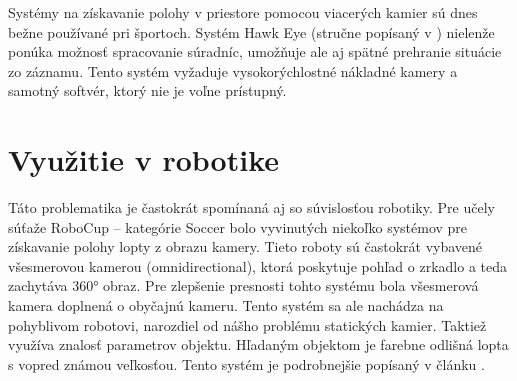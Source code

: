 Systémy na získavanie polohy v priestore pomocou viacerých kamier sú dnes bežne
používané pri športoch. Systém Hawk Eye (stručne popísaný v
\citet*{owens2003hawk}) nielenže ponúka možnosť spracovanie súradníc, umožňuje
ale aj spätné prehranie situácie zo záznamu. Tento systém vyžaduje
vysokorýchlostné nákladné kamery a samotný softvér, ktorý nie je voľne
prístupný.

\section{Využitie v robotike}

Táto problematika je častokrát spomínaná aj so súvislosťou robotiky. Pre učely
súťaže RoboCup -- kategórie Soccer bolo vyvinutých niekoľko systémov pre
získavanie polohy lopty z obrazu kamery. Tieto roboty sú častokrát vybavené
všesmerovou kamerou (omnidirectional), ktorá poskytuje pohľad o zrkadlo a teda
zachytáva 360° obraz. Pre zlepšenie presnosti tohto systému bola všesmerová
kamera doplnená o obyčajnú kameru. Tento systém sa ale nachádza na pohyblivom
robotovi, narozdiel od nášho problému statických kamier.  Taktiež využíva
znalosť parametrov objektu. Hľadaným objektom je farebne odlišná lopta s vopred
známou veľkosťou. Tento systém je podrobnejšie popísaný v článku
\citet*{kappeler20103d}.

